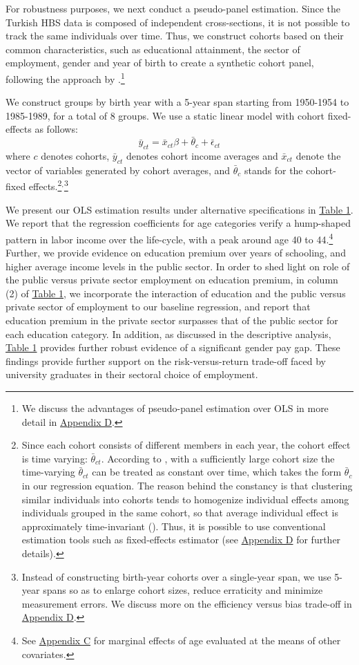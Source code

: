 \documentclass[12pt,author-year]{article}
\begin{document}
For robustness purposes, we next conduct a pseudo-panel estimation. Since the Turkish HBS data is composed of independent cross-sections, it is not possible to track the same individuals over time. Thus, we construct cohorts based on their common characteristics, such as educational attainment, the sector of employment, gender and year of birth to create a synthetic cohort panel, following the approach by \cite{Deaton}.\footnote{We discuss the advantages of pseudo-panel estimation over OLS in more detail in \hyperref[AppendixD]{Appendix D}.}


We construct groups by birth year with a 5-year span starting from 1950-1954 to 1985-1989, for a total of 8 groups. We use a static linear model with cohort fixed-effects as follows:
\[\bar{y}_{ct}=\bar{x}_{ct}\beta+\bar{\theta}_c+\bar{\epsilon}_{ct} \tag{2} \]
where $c$ denotes cohorts, $\bar{y}_{ct}$ denotes cohort income averages and $\bar{x}_{ct}$ denote the vector of variables generated by cohort averages, and $\bar{\theta}_c$ stands for the cohort-fixed effects.\footnote{Since each cohort consists of different members in each year, the cohort effect is time varying: $\bar{\theta}_{ct}$. According to \cite{Verbeek}, with a sufficiently large cohort size the time-varying $\bar{\theta}_{ct}$ can be treated as constant over time, which takes the form $\bar{\theta}_c$ in our regression equation. The reason behind the constancy is that clustering similar individuals into cohorts tends to homogenize individual effects among individuals grouped in the same cohort, so that average individual effect is approximately time-invariant (\citealp{Ziegelhofer}). Thus, it is possible to use conventional estimation tools such as fixed-effects estimator (see \hyperref[AppendixD]{Appendix D} for further details).}$^,$\footnote{Instead of constructing birth-year cohorts over a single-year span, we use 5-year spans so as to enlarge cohort sizes, reduce erraticity and minimize measurement errors. We discuss more on the efficiency versus bias trade-off in \hyperref[AppendixD]{Appendix D}.} 


We present our OLS estimation results under alternative specifications in \hyperref[table1]{Table 1}. We report that the regression coefficients for age categories verify a hump-shaped pattern in labor income over the life-cycle, with a peak around age 40 to 44.\footnote{See \hyperref[AppendixC]{Appendix C} for marginal effects of age evaluated at the means of other covariates.} Further, we provide evidence on education premium over years of schooling, and higher average income levels in the public sector. In order to shed light on role of the public versus private sector employment on education premium, in column (2) of \hyperref[table1]{Table 1}, we incorporate the interaction of education and the public versus private sector of employment to our baseline regression, and report that education premium in the private sector surpasses that of the public sector for each education category. In addition, as discussed in the descriptive analysis, \hyperref[table1]{Table 1} provides further robust evidence of a significant gender pay gap. These findings provide further support on the risk-versus-return trade-off faced by university graduates in their sectoral choice of employment. 
\end{document}
